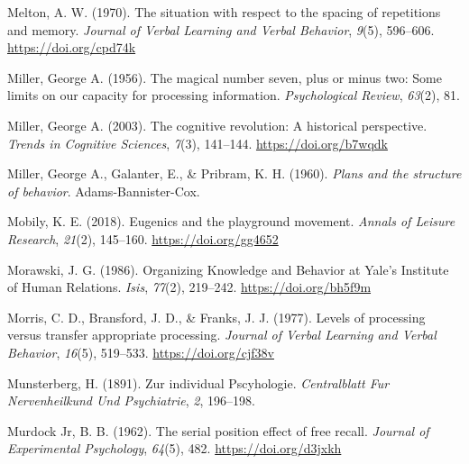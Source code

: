 \documentclass[
  oneside,
  12pt]{crumpbook}
\newlength{\cslhangindent}
\newlength{\cslentryspacingunit} %
\newenvironment{CSLReferences}[2] %
 {%
  \setlength{\parindent}{0pt}
  \ifodd #1
  \let\oldpar\par
  \def\par{\hangindent=\cslhangindent\oldpar}
  \fi
  \setlength{\parskip}{#2\cslentryspacingunit}
 }%
 {}
\begin{document}
\begin{CSLReferences}{1}{0}
\leavevmode{}%
Melton, A. W. (1970). The situation with respect to the spacing of repetitions and memory. \emph{Journal of Verbal Learning and Verbal Behavior}, \emph{9}(5), 596--606. \url{https://doi.org/cpd74k}

\leavevmode{}%
Miller, George A. (1956). The magical number seven, plus or minus two: {Some} limits on our capacity for processing information. \emph{Psychological Review}, \emph{63}(2), 81.

\leavevmode{}%
Miller, George A. (2003). The cognitive revolution: A historical perspective. \emph{Trends in Cognitive Sciences}, \emph{7}(3), 141--144. \url{https://doi.org/b7wqdk}

\leavevmode{}%
Miller, George A., Galanter, E., \& Pribram, K. H. (1960). \emph{Plans and the structure of behavior}. {Adams-Bannister-Cox}.

\leavevmode{}%
Mobily, K. E. (2018). Eugenics and the playground movement. \emph{Annals of Leisure Research}, \emph{21}(2), 145--160. \url{https://doi.org/gg4652}

\leavevmode{}%
Morawski, J. G. (1986). Organizing {Knowledge} and {Behavior} at {Yale}'s {Institute} of {Human Relations}. \emph{Isis}, \emph{77}(2), 219--242. \url{https://doi.org/bh5f9m}

\leavevmode{}%
Morris, C. D., Bransford, J. D., \& Franks, J. J. (1977). Levels of processing versus transfer appropriate processing. \emph{Journal of Verbal Learning and Verbal Behavior}, \emph{16}(5), 519--533. \url{https://doi.org/cjf38v}

\leavevmode{}%
Munsterberg, H. (1891). Zur individual {Pscyhologie}. \emph{Centralblatt Fur Nervenheilkund Und Psychiatrie}, \emph{2}, 196--198.

\leavevmode{}%
Murdock Jr, B. B. (1962). The serial position effect of free recall. \emph{Journal of Experimental Psychology}, \emph{64}(5), 482. \url{https://doi.org/d3jxkh}


\end{CSLReferences}
\end{document}
